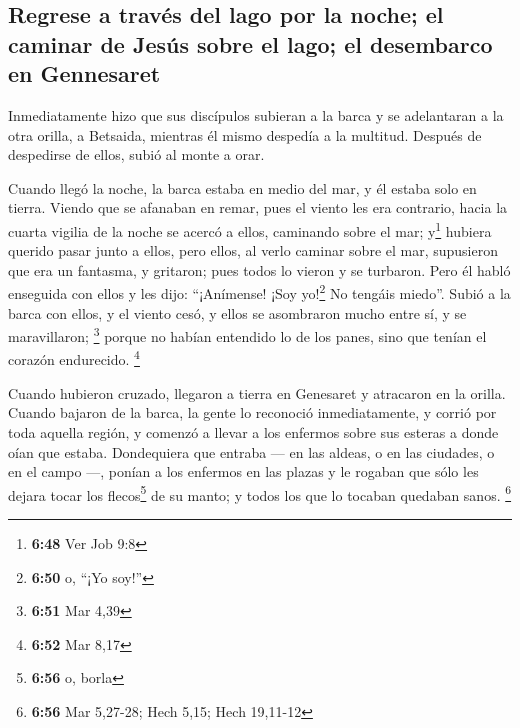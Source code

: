 \begin{paracol}{2}
\hypertarget{regrese-a-travuxe9s-del-lago-por-la-noche-el-caminar-de-jesuxfas-sobre-el-lago-el-desembarco-en-gennesaret}{%
\subsection{Regrese a través del lago por la noche; el caminar de Jesús
sobre el lago; el desembarco en
Gennesaret}\label{regrese-a-travuxe9s-del-lago-por-la-noche-el-caminar-de-jesuxfas-sobre-el-lago-el-desembarco-en-gennesaret}}

 Inmediatamente hizo que sus discípulos subieran a la
barca y se adelantaran a la otra orilla, a Betsaida, mientras él mismo
despedía a la multitud.  Después de despedirse de ellos,
subió al monte a orar.

 Cuando llegó la noche, la barca estaba en medio del mar,
y él estaba solo en tierra.  Viendo que se afanaban en
remar, pues el viento les era contrario, hacia la cuarta vigilia de la
noche se acercó a ellos, caminando sobre el mar; y\footnote{\textbf{6:48}
  Ver Job 9:8} hubiera querido pasar junto a ellos,  pero
ellos, al verlo caminar sobre el mar, supusieron que era un fantasma, y
gritaron;  pues todos lo vieron y se turbaron. Pero él
habló enseguida con ellos y les dijo: ``¡Anímense! ¡Soy yo!\footnote{\textbf{6:50}
  o, ``¡Yo soy!''} No tengáis miedo''.  Subió a la barca
con ellos, y el viento cesó, y ellos se asombraron mucho entre sí, y se
maravillaron; \footnote{\textbf{6:51} Mar 4,39}  porque
no habían entendido lo de los panes, sino que tenían el corazón
endurecido. \footnote{\textbf{6:52} Mar 8,17}

 Cuando hubieron cruzado, llegaron a tierra en Genesaret
y atracaron en la orilla.  Cuando bajaron de la barca, la
gente lo reconoció inmediatamente,  y corrió por toda
aquella región, y comenzó a llevar a los enfermos sobre sus esteras a
donde oían que estaba.  Dondequiera que entraba --- en
las aldeas, o en las ciudades, o en el campo ---, ponían a los enfermos
en las plazas y le rogaban que sólo les dejara tocar los
flecos\footnote{\textbf{6:56} o, borla} de su manto; y todos los que lo
tocaban quedaban sanos. \footnote{\textbf{6:56} Mar 5,27-28; Hech 5,15;
  Hech 19,11-12}

\switchcolumn
\begin{otherlanguage}{english}

\hypertarget{section-11}{%
}
\end{otherlanguage}
\end{paracol}
